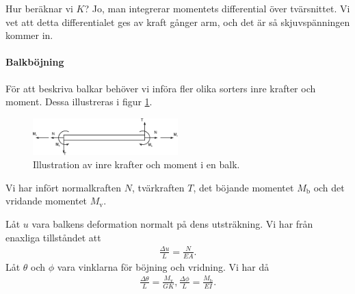 Hur beräknar vi $K$? Jo, man integrerar momentets differential över tvärsnittet. Vi vet att detta differentialet ges av kraft gånger arm, och det är så skjuvspänningen kommer in.

\paragraph{Balkböjning}
För att beskriva balkar behöver vi införa fler olika sorters inre krafter och moment. Dessa illustreras i figur \ref{fig:beam_forces}.
\begin{figure}[!ht]
	\centering
	\includegraphics[width = 0.5\textwidth]{./Images/beam_forces.eps}
	\caption{Illustration av inre krafter och moment i en balk.}
	\label{fig:beam_forces}
\end{figure}
Vi har infört normalkraften $N$, tvärkraften $T$, det böjande momentet $M_{\text{b}}$ och det vridande momentet $M_{\text{v}}$.

Låt $u$ vara balkens deformation normalt på dens utsträkning. Vi har från enaxliga tillståndet att
\begin{align*}
	\frac{\Delta u}{L} = \frac{N}{EA}.
\end{align*}
Låt $\theta$ och $\phi$ vara vinklarna för böjning och vridning. Vi har då
\begin{align*}
	\frac{\Delta\theta}{L} = \frac{M_{\text{v}}}{GK},
	\frac{\Delta\phi}{L} = \frac{M_{\text{b}}}{EI}.
\end{align*}

